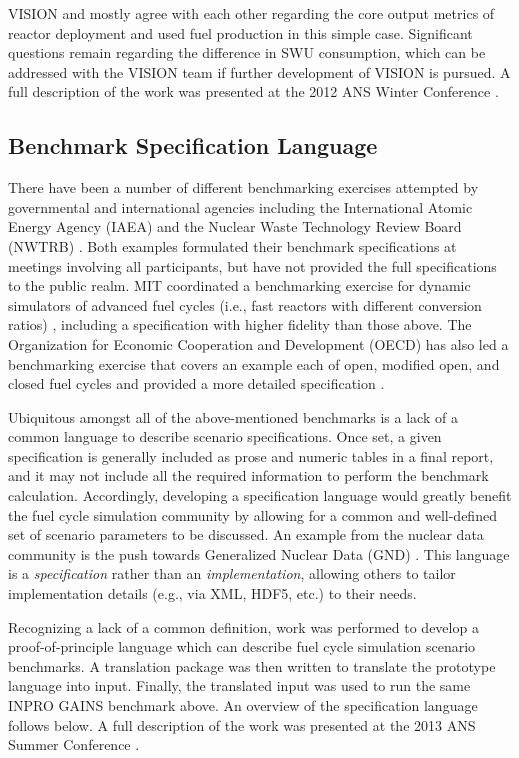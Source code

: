VISION and \Cyclus mostly agree with each other regarding the core output
metrics of reactor deployment and used fuel production in this simple
case. Significant questions remain regarding the difference in SWU consumption,
which can be addressed with the VISION team if further development of VISION is
pursued. A full description of the work was presented at the 2012
ANS Winter Conference \cite{gidden_once-through_2012}.

\subsection{Benchmark Specification Language}

There have been a number of different benchmarking exercises attempted by
governmental and international agencies including the International Atomic
Energy Agency (IAEA) \cite{_international_2011} and the Nuclear Waste Technology
Review Board (NWTRB) \cite{_nuclear_2011}.  Both examples formulated their
benchmark specifications at meetings involving all participants, but have not
provided the full specifications to the public realm. MIT coordinated a
benchmarking exercise for dynamic simulators of advanced fuel cycles (i.e., fast
reactors with different conversion ratios) \cite{guerin_benchmark_2009},
including a specification with higher fidelity than those above. The
Organization for Economic Cooperation and Development (OECD) has also led a
benchmarking exercise that covers an example each of open, modified open, and
closed fuel cycles \cite{boucher_benchmark_2012} and provided a more detailed
specification \cite{boucher_specification_2008}.

Ubiquitous amongst all of the above-mentioned benchmarks is a lack of a common
language to describe scenario specifications. Once set, a given specification is
generally included as prose and numeric tables in a final report, and it may not
include all the required information to perform the benchmark
calculation. Accordingly, developing a specification language would greatly
benefit the fuel cycle simulation community by allowing for a common and
well-defined set of scenario parameters to be discussed. An example from the
nuclear data community is the push towards Generalized Nuclear Data (GND)
\cite{mattoon_generalized_2012}. This language is a \emph{specification} rather
than an \emph{implementation}, allowing others to tailor implementation details
(e.g., via XML, HDF5, etc.) to their needs.

Recognizing a lack of a common definition, work was performed to develop a
proof-of-principle language which can describe fuel cycle simulation scenario
benchmarks. A translation package was then written to translate the prototype
language into \Cyclus input. Finally, the translated \Cyclus input was used to
run the same INPRO GAINS benchmark above. An overview of the specification
language follows below. A full description of the work was presented at the 2013
ANS Summer Conference \cite{gidden_developing_2013}.

